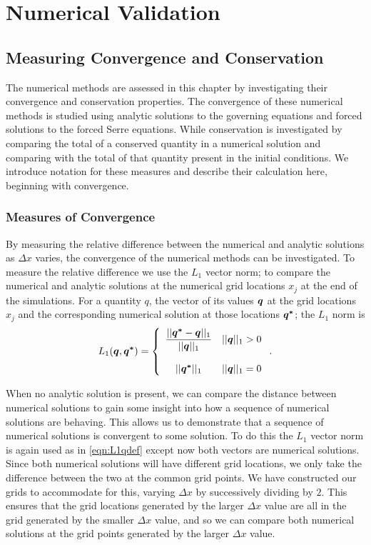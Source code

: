 
\chapter{Numerical Validation}
\label{chp:NumMethodComp}


\section{Measuring Convergence and Conservation}
The numerical methods are assessed in this chapter by investigating their convergence and conservation properties. The convergence of these numerical methods is studied using analytic solutions to the governing equations and forced solutions to the forced Serre equations. While conservation is investigated by comparing the total of a conserved quantity in a numerical solution and comparing with the total of that quantity present in the initial conditions. We introduce notation for these measures and describe their calculation here, beginning with convergence.

\subsection{Measures of Convergence}
By measuring the relative difference between the numerical and analytic solutions as $\Delta x$ varies, the convergence of the numerical methods can be investigated. To measure the relative difference we use the $L_1$ vector norm; to compare the numerical and analytic solutions at the numerical grid locations $x_j$ at the end of the simulations. For a quantity $q$, the vector of its values $\boldsymbol{q}$ at the grid locations $x_j$ and the corresponding numerical solution at those locations $\boldsymbol{q^*}$; the $L_1$ norm is
\begin{equation}
L_1(\boldsymbol{q},\boldsymbol{q^*}) =  \left\lbrace \begin{array}{c r} 
\dfrac{||\boldsymbol{q^*} - \boldsymbol{q}||_{1}}{||\boldsymbol{q}||_{1}} & ||\boldsymbol{q}||_{1} > 0 \\ \\
{||\boldsymbol{q^*}||_{1}} & ||\boldsymbol{q}||_{1} = 0  \end{array}\right. . 
\label{eqn:L1qdef} 
\end{equation}


When no analytic solution is present, we can compare the distance between numerical solutions to gain some insight into how a sequence of numerical solutions are behaving. This allows us to demonstrate that a sequence of numerical solutions is convergent to some solution. To do this the $L_1$ vector norm is again used as in \eqref{eqn:L1qdef} except now both vectors are numerical solutions. Since both numerical solutions will have different grid locations, we only take the difference between the two at the common grid points. We have constructed our grids to accommodate for this, varying $\Delta x$ by successively dividing by $2$. This ensures that the grid locations generated by the larger $\Delta x$ value are all in the grid generated by the smaller $\Delta x$ value, and so we can compare both numerical solutions at the grid points generated by the larger $\Delta x$ value.  


